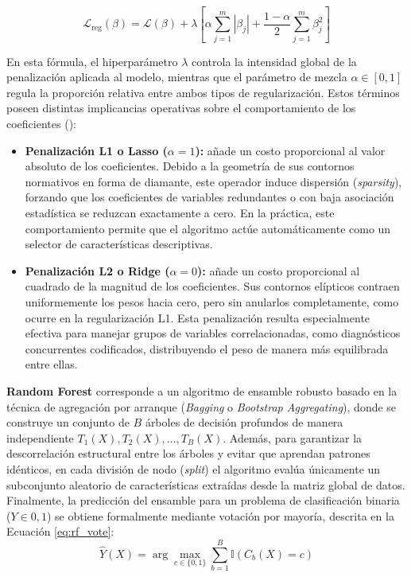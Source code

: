 \begin{equation}
    \mathcal{L}_{\text{reg}}(\beta) = \mathcal{L}(\beta) + \lambda \left[ \alpha \sum_{j=1}^{m} |\beta_j| + \frac{1-\alpha}{2} \sum_{j=1}^{m} \beta_j^2 \right]
    \label{eq:regularizacion}
\end{equation}

En esta fórmula, el hiperparámetro $\lambda$ controla la intensidad global de la penalización aplicada al modelo, mientras que el parámetro de mezcla $\alpha \in [0,1]$ regula la proporción relativa entre ambos tipos de regularización. Estos términos poseen distintas implicancias operativas sobre el comportamiento de los coeficientes (\cite{hastie2009elements}):

\begin{itemize}
\item \textbf{Penalización L1 o Lasso ($\alpha = 1$):} añade un costo proporcional al valor absoluto de los coeficientes. Debido a la geometría de sus contornos normativos en forma de diamante, este operador induce dispersión (\textit{sparsity}), forzando que los coeficientes de variables redundantes o con baja asociación estadística se reduzcan exactamente a cero. En la práctica, este comportamiento permite que el algoritmo actúe automáticamente como un selector de características descriptivas.
\item \textbf{Penalización L2 o Ridge ($\alpha = 0$):} añade un costo proporcional al cuadrado de la magnitud de los coeficientes. Sus contornos elípticos contraen uniformemente los pesos hacia cero, pero sin anularlos completamente, como ocurre en la regularización L1. Esta penalización resulta especialmente efectiva para manejar grupos de variables correlacionadas, como diagnósticos concurrentes codificados, distribuyendo el peso de manera más equilibrada entre ellas.
\end{itemize}



\textbf{Random Forest} corresponde a un algoritmo de ensamble robusto basado en la técnica de agregación por arranque (\textit{Bagging} o \textit{Bootstrap Aggregating}), donde se construye un conjunto de $B$ árboles de decisión profundos de manera independiente ${T_1(X), T_2(X), \dots, T_B(X)}$. Además, para garantizar la descorrelación estructural entre los árboles y evitar que aprendan patrones idénticos, en cada división de nodo (\textit{split}) el algoritmo evalúa únicamente un subconjunto aleatorio de características extraídas desde la matriz global de datos. Finalmente, la predicción del ensamble para un problema de clasificación binaria ($Y \in {0,1}$) se obtiene formalmente mediante votación por mayoría, descrita en la Ecuación \ref{eq:rf_vote}:
\begin{equation}
    \hat{Y}(X) = \arg\max_{c \in \{0,1\}} \sum_{b=1}^{B} \mathbb{I}(C_b(X) = c)
    \label{eq:rf_vote}
\end{equation}

